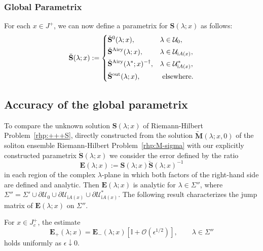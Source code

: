 \documentclass[12pt]{amsart}
\numberwithin{equation}{section}
\newcommand{\ii}{\mathrm{i}}
\newcommand{\SP}{\lambda}
\newcommand{\eps}{\epsilon}
\newcommand{\bigo}[1]{ \mathcal{O}\! \left( #1 \right) }
\begin{document}
\subsubsection{Global Parametrix}
For each $x \in J^+$, we can now define a parametrix for $\mathbf{S}(\SP;x)$ as follows:
\begin{equation}
	\breve{\mathbf{S}}(\SP;x) := \begin{dcases}
	\breve{\mathbf{S}}^0(\SP;x), & \SP \in \mathcal{U}_0, \\
	\breve{\mathbf{S}}^\text{Airy}(\SP;x), & \SP \in \mathcal{U}_{\ii A(x)}, \\
	\breve{\mathbf{S}}^\text{Airy}(\SP^*;x)^{-\dagger}, & \SP \in \mathcal{U}_{\ii A(x)}^*, \\
	\breve{\mathbf{S}}^{\mathrm{out}}(\SP;x), & \text{ elsewhere}.
	\end{dcases}
\label{eq:global-parametrix}
\end{equation}


\subsection{Accuracy of the global parametrix}
\label{sec-accuracy}
To compare the unknown solution $\mathbf{S}(\SP;x)$ of Riemann-Hilbert Problem~\ref{rhp:+++S}, directly constructed from the solution $\widetilde{\mathbf{M}}(\SP;x,0)$ of the soliton ensemble Riemann-Hilbert Problem~\ref{rhp:M-sigma} with our explicitly constructed parametrix $\dot{\mathbf{S}}(\SP;x)$ we consider the error defined by the ratio
\begin{equation}
	\mathbf{E}(\SP;x) := \mathbf{S}(\SP;x) \breve{\mathbf{S}}(\SP;x)^{-1}
	\label{eq:Edef}
\end{equation}
in each region of the complex $\SP$-plane in which both factors of the right-hand side are defined and analytic. Then  $\mathbf{E}(\SP;x)$ is analytic for $\SP \in \Sigma''$, where $\Sigma'' = \Sigma' \cup \partial \mathcal{U}_0 \cup \partial \mathcal{U}_{\ii A(x)} \cup \partial \mathcal{U}^*_{\ii A(x)} $. The following result characterizes the jump matrix of $\mathbf{E}(\SP;x)$ on $\Sigma''$.

\begin{lem} For $x \in J_c^+$, the estimate 
\begin{equation}
	\mathbf{E}_+(\SP;x) = \mathbf{E}_-(\SP;x) \left[ \mathbb{I} + \bigo{\eps^{1/2}} \right], \qquad \SP \in \Sigma''
	\label{eq:error.def}
\end{equation}
holds uniformly as $\eps \downarrow 0$.
\label{lem:error-accuracy}
\end{lem}
\end{document}
